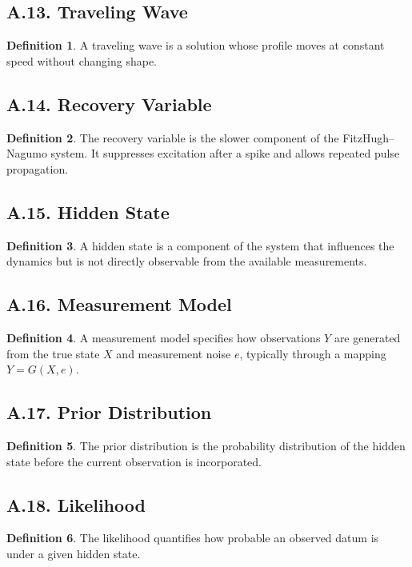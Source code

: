\documentclass[11pt]{article}
\theoremstyle{definition}
\newtheorem{definition}{Definition}
\theoremstyle{remark}
\begin{document}
\subsection*{A.13. Traveling Wave}
\begin{definition}
A traveling wave is a solution whose profile moves at constant speed without changing shape.
\end{definition}

\subsection*{A.14. Recovery Variable}
\begin{definition}
The recovery variable is the slower component of the FitzHugh--Nagumo system. It suppresses excitation after a spike and allows repeated pulse propagation.
\end{definition}

\subsection*{A.15. Hidden State}
\begin{definition}
A hidden state is a component of the system that influences the dynamics but is not directly observable from the available measurements.
\end{definition}

\subsection*{A.16. Measurement Model}
\begin{definition}
A measurement model specifies how observations \(Y\) are generated from the true state \(X\) and measurement noise \(e\), typically through a mapping \(Y=G(X,e)\).
\end{definition}

\subsection*{A.17. Prior Distribution}
\begin{definition}
The prior distribution is the probability distribution of the hidden state before the current observation is incorporated.
\end{definition}

\subsection*{A.18. Likelihood}
\begin{definition}
The likelihood quantifies how probable an observed datum is under a given hidden state.
\end{definition}
\end{document}
